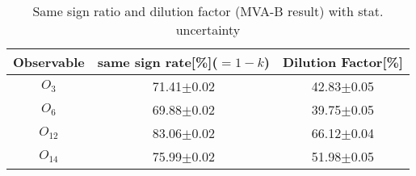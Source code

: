 		\begin{center}
		\setlength{\tabcolsep}{12pt}
		\begin{longtable}{ c | c c }
		\caption{Same sign ratio and dilution factor (MVA-B result) with stat. uncertainty} \\
		Observable & same sign rate[\%]($=1-k$) & Dilution Factor[\%] \\
		\hline
		$O_{3}$ & 71.41$\pm$0.02  &  42.83$\pm$0.05  \\
		$O_{6}$ &  69.88$\pm$0.02  &  39.75$\pm$0.05  \\
		$O_{12}$ &  83.06$\pm$0.02  &  66.12$\pm$0.04  \\
		$O_{14}$ &  75.99$\pm$0.02  &  51.98$\pm$0.05  \\
		\hline
		\end{longtable}
		\label{Dilution:tb:MVAB}
		\end{center}


\FloatBarrier
